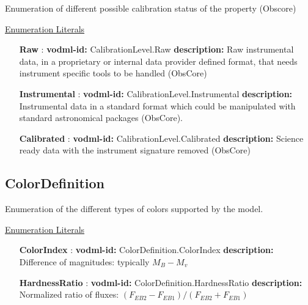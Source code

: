   Enumeration of different possible calibration status of the property (Obscore)

  \noindent \underline{Enumeration Literals}
  \vspace{-\parsep}
  \small
  \begin{itemize}
  
    \item[\textbf{Raw}]: \textbf{vodml-id:} CalibrationLevel.Raw \newline
          \textbf{description:} Raw instrumental data, in a proprietary or internal data provider defined format, that needs instrument specific tools to be handled (ObsCore)
    \item[\textbf{Instrumental}]: \textbf{vodml-id:} CalibrationLevel.Instrumental \newline
          \textbf{description:} Instrumental data in a standard format which could be manipulated with standard astronomical packages (ObsCore).
    \item[\textbf{Calibrated}]: \textbf{vodml-id:} CalibrationLevel.Calibrated \newline
          \textbf{description:} Science ready data with the instrument signature removed (ObsCore)
  \end{itemize}
  \normalsize


  \subsection{ColorDefinition}
  \label{sect:ColorDefinition}

  Enumeration of the different types of colors supported by the model.

  \noindent \underline{Enumeration Literals}
  \vspace{-\parsep}
  \small
  \begin{itemize}
  
    \item[\textbf{ColorIndex}]: \textbf{vodml-id:} ColorDefinition.ColorIndex \newline
          \textbf{description:} Difference of magnitudes: typically $M_B - M_v$
    \item[\textbf{HardnessRatio}]: \textbf{vodml-id:} ColorDefinition.HardnessRatio \newline
          \textbf{description:} Normalized ratio of fluxes: $(F_{EB2} - F_{EB1}) / (F_{EB2} + F_{EB1})$
  \end{itemize}
  \normalsize


\pagebreak
